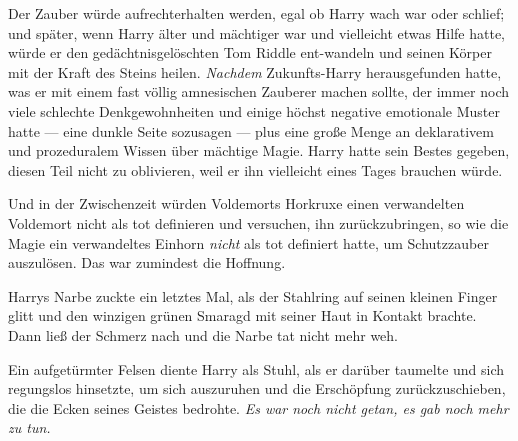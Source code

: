Der Zauber würde aufrechterhalten werden, egal ob Harry wach war oder schlief; und später, wenn Harry älter und mächtiger war und vielleicht etwas Hilfe hatte, würde er den gedächtnisgelöschten Tom Riddle ent-wandeln und seinen Körper mit der Kraft des Steins heilen. \emph{Nachdem} Zukunfts-Harry herausgefunden hatte, was er mit einem fast völlig amnesischen Zauberer machen sollte, der immer noch viele schlechte Denkgewohnheiten und einige höchst negative emotionale Muster hatte — eine dunkle Seite sozusagen — plus eine große Menge an deklarativem und prozeduralem Wissen über mächtige Magie. Harry hatte sein Bestes gegeben, diesen Teil nicht zu oblivieren, weil er ihn vielleicht eines Tages brauchen würde.

Und in der Zwischenzeit würden Voldemorts Horkruxe einen verwandelten Voldemort nicht als tot definieren und versuchen, ihn zurückzubringen, so wie die Magie ein verwandeltes Einhorn \emph{nicht} als tot definiert hatte, um Schutzzauber auszulösen. Das war zumindest die Hoffnung.

Harrys Narbe zuckte ein letztes Mal, als der Stahlring auf seinen kleinen Finger glitt und den winzigen grünen Smaragd mit seiner Haut in Kontakt brachte. Dann ließ der Schmerz nach und die Narbe tat nicht mehr weh.

Ein aufgetürmter Felsen diente Harry als Stuhl, als er darüber taumelte und sich regungslos hinsetzte, um sich auszuruhen und die Erschöpfung zurückzuschieben, die die Ecken seines Geistes bedrohte. \emph{Es war noch nicht getan, es gab noch mehr zu tun.}

